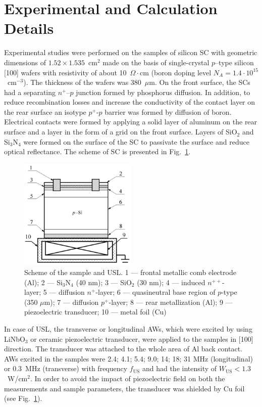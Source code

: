 \section{Experimental and Calculation Details}
\label{sec:1}

Experimental studies were performed on the samples of silicon SC with geometric dimensions of $1.52\times1.535$~cm$^2$ made on the basis of single-crystal  $p$--type silicon [100] wafers with resistivity of about 10~$\Omega\cdot$cm
(boron doping level  $N_A=1.4\cdot10^{15}$~cm$^{-3}$).
The thickness of the wafers was 380~$\mu$m.
On the front surface, the SCs had a separating $n^+$--$p$ junction formed by phosphorus diffusion.
In addition, to reduce recombination losses and increase the conductivity of the contact layer
on the rear surface an isotype $p^+$-$p$ barrier was formed by diffusion of boron.
Electrical contacts were formed by applying a solid layer of aluminum on the rear surface and a layer in the form of a grid on the front surface.
Layers of SiO$_2$ and Si$_3$N$_4$ were formed on the surface of the SC to passivate the surface and reduce optical reflectance.
The scheme of SC is presented in Fig.~\ref{figChem}.
\begin{figure}
 \includegraphics[width=0.5\textwidth]{Fig1}
\caption{Scheme of the sample and USL.
1 –-- frontal metallic comb electrode (Al);
2 --– Si$_3$N$_4$ (40 nm);
3 –-- SiO$_2$ (30 nm);
4 –-- induced $n^{++}$-layer;
5 –-- diffusion $n^+$-layer;
6 –-- quasineutral base region of $p$-type (350 $\mu$m);
7 –-- diffusion $p^+$-layer;
8 –-- rear metallization (Al);
9 –-- piezoelectric transducer;
10 –-- metal foil (Cu)}
\label{figChem}       %
\end{figure}

In case of USL, the transverse or longitudinal AWs, which were excited by using LiNbO$_3$ or ceramic piezoelectric transducer,
were applied to the samples in [100] direction.
The transducer was attached to the whole area of Al back contact.
AWs excited in the samples were 2.4; 4.1; 5.4; 9.0; 14; 18; 31 MHz (longitudinal) or 0.3~MHz (transverse)
with frequency $f_\mathrm{US}$ and had the intensity of $W_\mathrm{US}<1.3$~W/cm$^2$.
In order to avoid the impact of piezoelectric field on both the measurements and sample parameters,
the transducer was shielded by Cu foil (see Fig.~\ref{figChem}).

